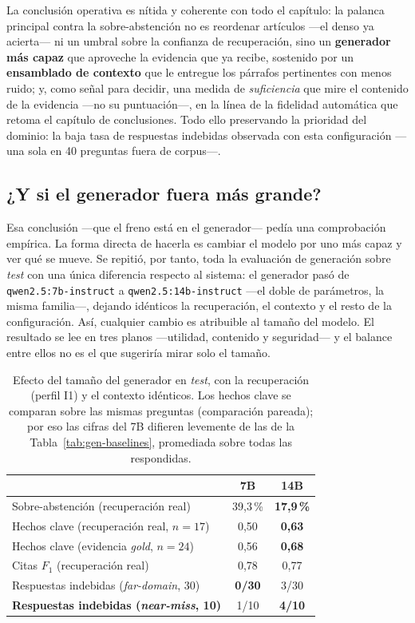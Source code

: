 La conclusión operativa es nítida y coherente con todo el capítulo: la palanca principal contra la sobre-abstención no es reordenar artículos —el denso ya acierta— ni un umbral sobre la confianza de recuperación, sino un \textbf{generador más capaz} que aproveche la evidencia que ya recibe, sostenido por un \textbf{ensamblado de contexto} que le entregue los párrafos pertinentes con menos ruido; y, como señal para decidir, una medida de \emph{suficiencia} que mire el contenido de la evidencia —no su puntuación—, en la línea de la fidelidad automática que retoma el capítulo de conclusiones. Todo ello preservando la prioridad del dominio: la baja tasa de respuestas indebidas observada con esta configuración —una sola en 40 preguntas fuera de corpus—.

\subsection{¿Y si el generador fuera más grande?}
\label{subsec:gen-tamano}

Esa conclusión —que el freno está en el generador— pedía una comprobación empírica. La forma directa de hacerla es cambiar el modelo por uno más capaz y ver qué se mueve. Se repitió, por tanto, toda la evaluación de generación sobre \emph{test} con una única diferencia respecto al sistema: el generador pasó de \texttt{qwen2.5:7b-instruct} a \texttt{qwen2.5:14b-instruct} —el doble de parámetros, la misma familia—, dejando idénticos la recuperación, el contexto y el resto de la configuración. Así, cualquier cambio es atribuible al tamaño del modelo. El resultado se lee en tres planos —utilidad, contenido y seguridad— y el balance entre ellos no es el que sugeriría mirar solo el tamaño.

\begin{table}[htbp]
    \centering
    \small
    \renewcommand{\arraystretch}{1.2}
    \caption{Efecto del tamaño del generador en \emph{test}, con la recuperación (perfil I1) y el contexto idénticos. Los hechos clave se comparan sobre las mismas preguntas (comparación pareada); por eso las cifras del 7B difieren levemente de las de la Tabla~\ref{tab:gen-baselines}, promediada sobre todas las respondidas.}
    \label{tab:gen-tamano}
    \begin{tabular}{|l|c|c|}
        \hline
        \textbf{} & \textbf{7B} & \textbf{14B} \\
        \hline
        Sobre-abstención (recuperación real)          & 39,3\,\% & \textbf{17,9\,\%} \\
        Hechos clave (recuperación real, $n=17$)       & 0,50     & \textbf{0,63} \\
        Hechos clave (evidencia \emph{gold}, $n=24$)      & 0,56     & \textbf{0,68} \\
        Citas $F_1$ (recuperación real)                & 0,78     & 0,77 \\
        Respuestas indebidas (\emph{far-domain}, 30)   & \textbf{0/30} & 3/30 \\
        \textbf{Respuestas indebidas (\emph{near-miss}, 10)} & 1/10 & \textbf{4/10} \\
        \hline
    \end{tabular}
\end{table}

